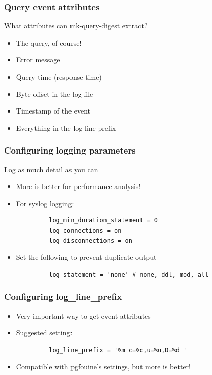 \begin{frame}
   \frametitle{Query event attributes}
   \begin{block}{What attributes can mk-query-digest extract?}
   \begin{itemize}
      \item The query, of course!
      \item Error message
      \item Query time (response time)
      \item Byte offset in the log file
      \item Timestamp of the event
      \item Everything in the log line prefix
   \end{itemize}
   \end{block}
\end{frame}

\begin{frame}[fragile]
   \frametitle{Configuring logging parameters}
   \begin{block}{Log as much detail as you can}
   \begin{itemize}
      \item More is better for performance analysis!
      \item For syslog logging:
         \begin{verbatim}
         log_min_duration_statement = 0
         log_connections = on
         log_disconnections = on
         \end{verbatim}
      \item Set the following to prevent duplicate output
         \begin{verbatim}
         log_statement = 'none' # none, ddl, mod, all
         \end{verbatim}
   \end{itemize}
   \end{block}
\end{frame}

\begin{frame}[fragile]
   \frametitle{Configuring log\_line\_prefix}
   \begin{itemize}
      \item Very important way to get event attributes
      \item Suggested setting:
         \begin{verbatim}
         log_line_prefix = '%m c=%c,u=%u,D=%d '
         \end{verbatim}
      \item Compatible with pgfouine's settings, but more is better!
   \end{itemize}
\end{frame}

